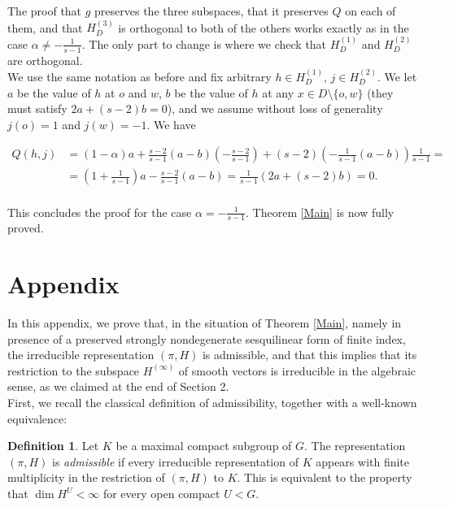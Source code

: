 \documentclass{article}
\theoremstyle{definition}
\newtheorem{dfn}{Definition}[section]
\theoremstyle{remark}
\theoremstyle{plain}
\begin{document}
The proof that $g$ preserves the three subspaces, that it preserves $Q$ on each of them, and that $H_D^{(3)}$ is orthogonal to both of the others works exactly as in the case $\alpha\neq -\frac{1}{s-1}$. The only part to change is where we check that $H_D^{(1)}$ and $H_D^{(2)}$ are orthogonal. \\

We use the same notation as before and fix arbitrary $h\in H_D^{(1)}$, $j\in H_D^{(2)}$. We let $a$ be the value of $h$ at $o$ and $w$, $b$ be the value of $h$ at any $x\in D\setminus\{o,w\}$ (they must satisfy $2a+(s-2)b=0$), and we assume without loss of generality $j(o)=1$ and $j(w)=-1$. We have

\begin{align*}
Q(h,j)&=(1-\alpha)a+\frac{s-2}{s-1}(a-b)\left(-\frac{s-2}{s-1}\right)+(s-2)\left(-\frac{1}{s-1}(a-b)\right)\frac{1}{s-1}= \\[1em]
&=\left(1+\frac{1}{s-1}\right)a-\frac{s-2}{s-1}(a-b)=\frac{1}{s-1}(2a+(s-2)b)=0. \\
\end{align*}

This concludes the proof for the case $\alpha=-\frac{1}{s-1}$. Theorem \ref{Main} is now fully proved. \\

\appendix
\section{Appendix}

In this appendix, we prove that, in the situation of Theorem \ref{Main}, namely in presence of a preserved strongly nondegenerate sesquilinear form of finite index, the irreducible representation $(\pi,H)$ is admissible, and that this implies that its restriction to the subspace $H^{(\infty)}$ of smooth vectors is irreducible in the algebraic sense, as we claimed at the end of Section 2. \\

First, we recall the classical definition of admissibility, together with a well-known equivalence:

\begin{dfn}
    Let $K$ be a maximal compact subgroup of $G$. The representation $(\pi,H)$ is \textit{admissible} if every irreducible representation of $K$ appears with finite multiplicity in the restriction of $(\pi,H)$ to $K$. This is equivalent to the property that $\dim{H^U}<\infty$ for every open compact $U<G$. \\
\end{dfn}
\end{document}
